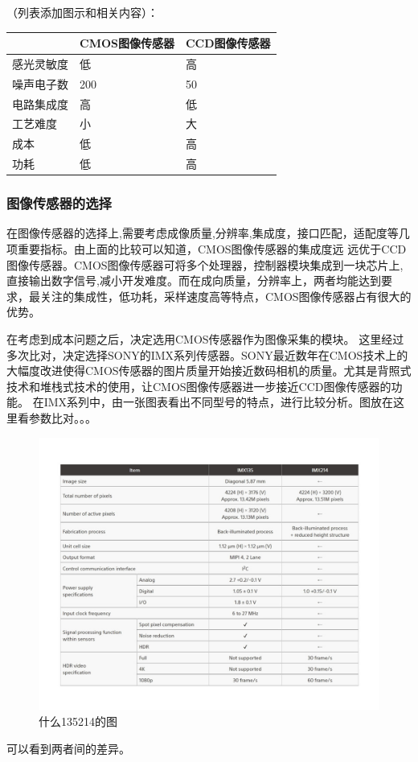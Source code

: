 （列表添加图示和相关内容）：
\begin{table}[ht]
	
\begin{tabular}{|L{2.2cm}|C{4cm}|R{4cm}|}
\toprule[1pt]
\hline
	& CMOS图像传感器 & CCD图像传感器 \\ \hline
	感光灵敏度 & 低 & 高 \\ \hline
	噪声电子数 & 200 & 50 \\ \hline
	电路集成度 & 高 & 低 \\ \hline
	工艺难度 & 小 & 大 \\ \hline
	成本 & 低 & 高 \\ \hline
	功耗 & 低 & 高 \\  \hline
\end{tabular} 
\end{table}

\subsubsection{图像传感器的选择}
在图像传感器的选择上,需要考虑成像质量,分辨率,集成度，接口匹配，适配度等几项重要指标。由上面的比较可以知道，CMOS图像传感器的集成度远
远优于CCD图像传感器。CMOS图像传感器可将多个处理器，控制器模块集成到一块芯片上,直接输出数字信号,减小开发难度。而在成向质量，分辨率上，两者均能达到要求，最关注的集成性，低功耗，采样速度高等特点，CMOS图像传感器占有很大的优势。

在考虑到成本问题之后，决定选用CMOS传感器作为图像采集的模块。
这里经过多次比对，决定选择SONY的IMX系列传感器。SONY最近数年在CMOS技术上的大幅度改进使得CMOS传感器的图片质量开始接近数码相机的质量。尤其是背照式技术和堆栈式技术的使用，让CMOS图像传感器进一步接近CCD图像传感器的功能。
在IMX系列中，由一张图表看出不同型号的特点，进行比较分析。图放在这里看参数比对。。。

\begin{figure}[h]
\centering
\includegraphics[width=0.7\linewidth]{Figure/IMXCMOSp}
\caption{什么135214的图}
\label{fig:IMXCMOSp}
\end{figure}
可以看到两者间的差异。

